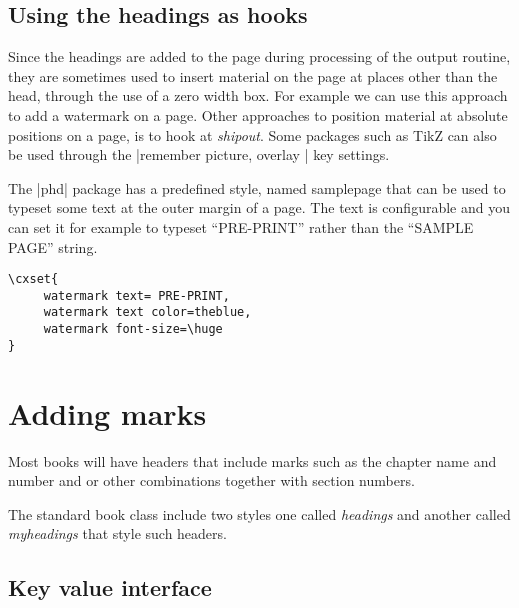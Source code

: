 \subsection{Using the headings as hooks}

Since the headings are added to the page during processing of the output routine, they are sometimes used
to insert material on the page at places other than the head, through the use of a zero width box. For example we
can use this approach to add a watermark on a page. Other approaches to position material at absolute positions
on a page, is to hook at \emph{shipout}. Some packages such as TikZ can also be used through the |remember picture, overlay |  key settings. 

The |phd| package has a predefined style, named samplepage that can be used to typeset some text at the outer margin of a page. The text is configurable and you can set it for example to typeset “PRE-PRINT” rather than the “SAMPLE PAGE” string. 

\begin{tcolorbox}
\begin{lstlisting}
\cxset{
     watermark text= PRE-PRINT,
     watermark text color=theblue,
     watermark font-size=\huge
}
\end{lstlisting}
\end{tcolorbox}

\makeatletter
{}
\makeatother

   
\pagestyle{samplepage}


\section{Adding marks}

Most books will have headers that include marks such as the chapter name and number and or other combinations together with section numbers.

The standard book class include two styles one called \textit{headings} and another called \textit{myheadings} that style such headers.




\subsection{Key value interface}
\makeatletter
{}

